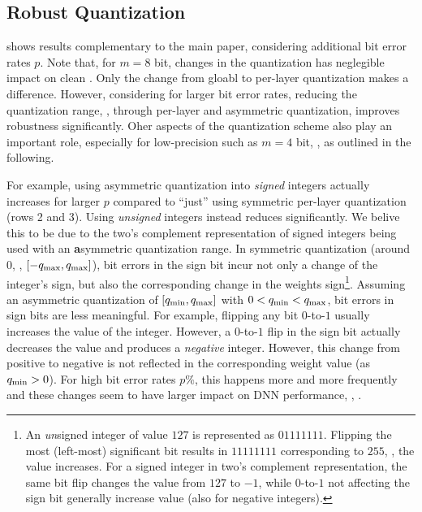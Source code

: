 \subsection{Robust Quantization}
\label{subsec:supp-experiments-quantization}

 shows results complementary to the main paper, considering additional bit error rates $p$. Note that, for $m = 8$ bit, changes in the quantization has neglegible impact on clean \TE. Only the change from gloabl to per-layer quantization makes a difference. However, considering \RTE for larger bit error rates, reducing the quantization range, \eg, through per-layer and asymmetric quantization, improves robustness significantly. Oher aspects of the quantization scheme also play an important role, especially for low-precision such as $m = 4$ bit, \cf {}, as outlined in the following.

For example, using asymmetric quantization into \emph{signed} integers actually increases \RTE for larger $p$ compared to ``just'' using symmetric per-layer quantization (rows 2 and 3). Using \emph{unsigned} integers instead reduces \RTE significantly. We belive this to be due to the two's complement representation of signed integers being used with an \textbf{a}symmetric quantization range. In symmetric quantization (around $0$, \ie, $[-\qmax, \qmax]$), bit errors in the sign bit incur not only a change of the integer's sign, but also the corresponding change in the weights sign\footnote{An \emph{un}signed integer of value $127$ is represented as $0111 1111$. Flipping the most (left-most) significant bit results in $1111 1111$ corresponding to $255$, \ie, the value increases. For a signed integer in two's complement representation, the same bit flip changes the value from $127$ to $-1$, while $0$-to-$1$ not affecting the sign bit generally increase value (also for negative integers).}. Assuming an asymmetric quantization of $[\qmin, \qmax]$ with $0 < \qmin < \qmax$, bit errors in sign bits are less meaningful. For example, flipping any bit $0$-to-$1$ usually increases the value of the integer. However, a $0$-to-$1$ flip in the sign bit actually decreases the value and produces a \emph{negative} integer. However, this change from positive to negative is not reflected in the corresponding weight value (as $\qmin > 0$). For high bit error rates $p\%$, this happens more and more frequently and these changes seem to have larger impact on DNN performance, \ie, \RTE.

